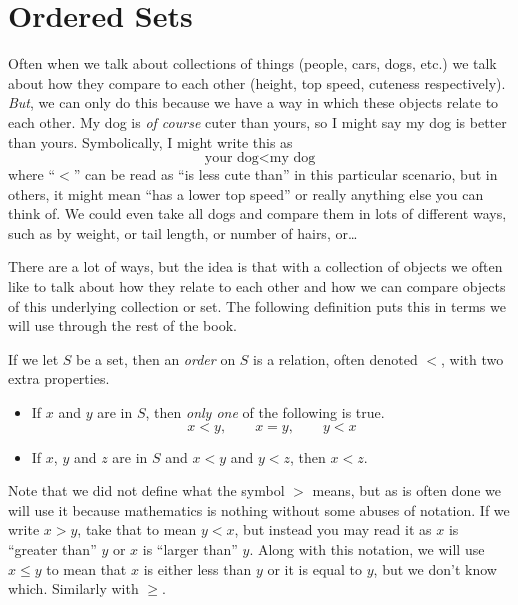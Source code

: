 \documentclass[../../templates/section]{subfiles}
\begin{document}
\section{Ordered Sets}\label{sec:ordered-sets}

Often when we talk about collections of things (people, cars, dogs, etc.) we
talk about how they compare to each other (height, top speed, cuteness
respectively). \emph{But}, we can only do this because we have a way in which
these objects relate to each other. My dog is \emph{of course} cuter than
yours, so I might say my dog is better than yours. Symbolically, I might write
this as
\begin{equation*}\label{eq:doges}
    \text{your dog} < \text{my dog}
\end{equation*}
where ``$<$'' can be read as ``is less cute than'' in this particular scenario,
but in others, it might mean ``has a lower top speed'' or really anything else
you can think of. We could even take all dogs and compare them in lots of
different ways, such as by weight, or tail length, or number of hairs, or\ldots

There are a lot of ways, but the idea is that with a collection of objects we
often like to talk about how they relate to each other and how we can compare
objects of this underlying collection or set. The following definition puts
this in terms we will use through the rest of the book.

\begin{definition}\label{def:order}
    If we let $S$ be a set, then an \emph{order} on $S$ is a relation, often
    denoted $<$, with two extra properties.
    \begin{itemize}
        \item If $x$ and $y$ are in $S$, then \emph{only one} of the following
        is true.
        \[ x < y, \qquad x = y, \qquad y < x\]
        \item If $x$, $y$ and $z$ are in $S$ and $x < y$ and $y < z$, then $x <
        z$.
    \end{itemize}
\end{definition}

Note that we did not define what the symbol $>$ means, but as is often done we
will use it because mathematics is nothing without some abuses of notation. If
we write $x > y$, take that to mean $y < x$, but instead you may read it as $x$
is ``greater than'' $y$ or $x$ is ``larger than'' $y$. Along with this
notation, we will use $x \le y$ to mean that $x$ is either less than $y$ or it
is equal to $y$, but we don't know which. Similarly with $\ge$.
\end{document}
